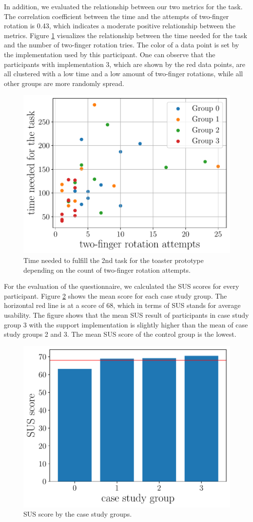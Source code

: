 \documentclass[11pt, a4paper]{article}
\begin{document}
			In addition, we evaluated the relationship between our two metrics for the task. The correlation coefficient between the time and the attempts of two-finger rotation is 0.43, which indicates a moderate positive relationship between the metrics. Figure \ref{fig:scatter} visualizes the relationship between the time needed for the task and the number of two-finger rotation tries. The color of a data point is set by the implementation used by this participant. One can observe that the participants with implementation 3, which are shown by the red data points, are all clustered with a low time and a low amount of two-finger rotations, while all other groups are more randomly spread.

			\begin{figure}[H]
				\centering
				\includegraphics[width=.49\textwidth]{img/plot/plot_scatter.pdf}
				\caption{Time needed to fulfill the 2nd task for the toaster prototype depending on the count of two-finger rotation attempts.}
				\label{fig:scatter}
			\end{figure}

			For the evaluation of the questionnaire, we calculated the \ac{SUS} scores for every participant. Figure \ref{fig:sus} shows the mean score for each case study group. The horizontal red line is at a score of 68, which in terms of \ac{SUS} stands for average usability. The figure shows that the mean \ac{SUS} result of participants in case study group 3 with the support implementation is slightly higher than the mean of case study groups 2 and 3. The mean \ac{SUS} score of the control group is the lowest.

			\begin{figure}[H]
				\centering
				\includegraphics[width=.49\textwidth]{img/plot/plot_sus.pdf}
				\caption{SUS score by the case study groups.}
				\label{fig:sus}
			\end{figure}
\end{document}
